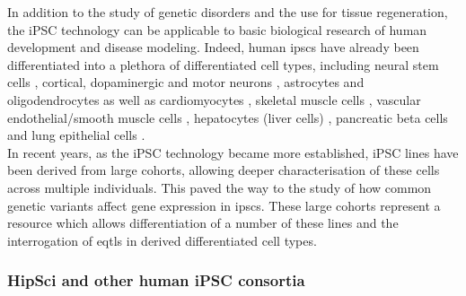 In addition to the study of genetic disorders and the use for tissue regeneration, the iPSC technology can be applicable to basic biological research of human development and disease modeling.
Indeed, human \glspl{ipsc} have already been differentiated into a plethora of differentiated cell types, including
neural stem cells \cite{d2014large}, 
cortical, dopaminergic 
and motor neurons \cite{shi2012human, kriks2011dopamine, karumbayaram2009directed},
astrocytes \cite{shaltouki2013efficient} and
oligodendrocytes \cite{douvaras2014efficient} 
as well as
cardiomyocytes \cite{burridge2014chemically}, 
skeletal muscle cells \cite{maffioletti2015efficient}, 
vascular endothelial/smooth muscle cells \cite{patsch2015generation}, 
hepatocytes (liver cells) \cite{si2010highly},
pancreatic beta cells \cite{zhang2009highly} and 
lung epithelial cells \cite{huang2014efficient}.\\

In recent years, as the iPSC technology became more established, iPSC lines have been derived from large cohorts, allowing deeper characterisation of these cells across multiple individuals.
This paved the way to the study of how common genetic variants affect gene expression in \glspl{ipsc}.
These large cohorts represent a resource which allows differentiation of a number of these lines and the interrogation of \glspl{eqtl} in derived differentiated cell types.

\subsubsection{HipSci and other human iPSC consortia}
\label{sec:HipSci}

